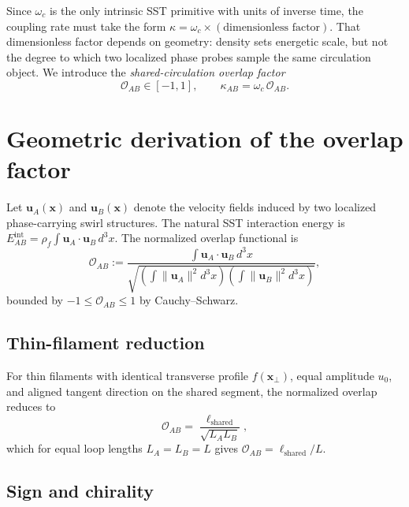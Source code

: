 \documentclass[11pt]{article}
\newcommand{\rhoF}{\rho_{\!f}}
\begin{document}
Since $\omega_c$ is the only intrinsic SST primitive with units of inverse time, the coupling rate must take the form $\kappa = \omega_c \times (\text{dimensionless factor})$. That dimensionless factor depends on geometry: density sets energetic scale, but not the degree to which two localized phase probes sample the same circulation object. We introduce the \emph{shared-circulation overlap factor}
\begin{equation}
    \mathcal{O}_{AB} \in [-1,1], \qquad \kappa_{AB} = \omega_c\,\mathcal{O}_{AB}.
    \label{eq:kappa}
\end{equation}

\section{Geometric derivation of the overlap factor}

Let $\mathbf{u}_A(\mathbf{x})$ and $\mathbf{u}_B(\mathbf{x})$ denote the velocity fields induced by two localized phase-carrying swirl structures. The natural SST interaction energy is $E_{AB}^{\mathrm{int}} = \rhoF\int \mathbf{u}_A \cdot \mathbf{u}_B\,d^3x$. The normalized overlap functional is
\begin{equation}
    \mathcal{O}_{AB} :=
    \frac{\displaystyle\int \mathbf{u}_A\cdot\mathbf{u}_B\,d^3x}
    {\displaystyle\sqrt{\left(\int\|\mathbf{u}_A\|^2 d^3x\right)\!\left(\int\|\mathbf{u}_B\|^2 d^3x\right)}},
    \label{eq:OAB_def}
\end{equation}
bounded by $-1 \le \mathcal{O}_{AB} \le 1$ by Cauchy--Schwarz.

\subsection{Thin-filament reduction}

For thin filaments with identical transverse profile $f(\mathbf{x}_\perp)$, equal amplitude $u_0$, and aligned tangent direction on the shared segment, the normalized overlap reduces to
\begin{equation}
    \mathcal{O}_{AB} = \frac{\ell_{\mathrm{shared}}}{\sqrt{L_A L_B}},
\end{equation}
which for equal loop lengths $L_A = L_B = L$ gives $\mathcal{O}_{AB} = \ell_{\mathrm{shared}}/L$.

\subsection{Sign and chirality}
\end{document}
